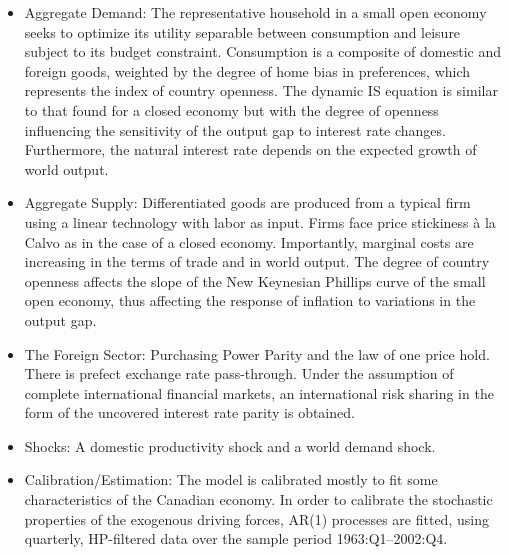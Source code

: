 \documentclass[11pt,a4paper]{article}
\begin{document}
	\begin{itemize}
		
		\item Aggregate Demand: The representative household in a small open economy seeks to optimize its utility separable between consumption and leisure subject to its budget constraint. Consumption is a composite of domestic and foreign goods, weighted by the degree of home bias in preferences, which represents the index of country openness. The dynamic IS equation is similar to that found for a closed economy but with the degree of openness influencing the sensitivity of the output gap to interest rate changes. Furthermore, the natural interest rate depends on the expected growth of world output.
		
		\item Aggregate Supply: Differentiated goods are produced from a typical firm using a linear technology with labor as input. Firms face price stickiness \`{a} la Calvo as in the case of a closed economy. Importantly, marginal costs are increasing in the terms of trade and in world output. The degree of country openness affects the slope of the New Keynesian Phillips curve of the small open economy, thus affecting the response of inflation to variations in the output gap.
		
		\item The Foreign Sector: Purchasing Power Parity and the law of one price hold. There is prefect exchange rate pass-through. Under the assumption of complete international financial markets, an international risk sharing in the form of the uncovered interest rate parity is obtained.
		
		\item Shocks: A domestic productivity shock and a world demand shock.
		
		\item Calibration/Estimation: The model is calibrated mostly to fit some characteristics of the Canadian economy. In order to calibrate the stochastic properties of the exogenous driving forces, AR(1) processes are fitted, using quarterly, HP-filtered data over the sample period 1963:Q1--2002:Q4.
		
		
	\end{itemize}
	
\end{document}
